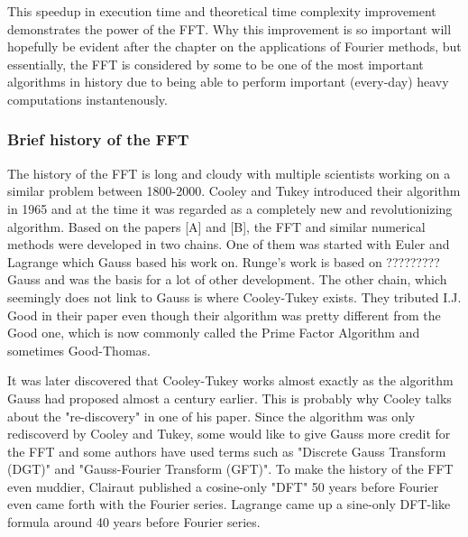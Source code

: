 This speedup in execution time and theoretical time complexity improvement demonstrates the power of the FFT. Why this improvement is so important will hopefully be evident after the chapter on the applications of Fourier methods, but essentially, the FFT is considered by some  to be one of the most important algorithms in history due to being able to perform important (every-day) heavy computations instantenously. 

\subsubsection{Brief history of the FFT} 
The history of the FFT is long and cloudy with multiple scientists working on a similar problem between 1800-2000. Cooley and Tukey introduced their algorithm in 1965 and at the time it was regarded as a completely new and revolutionizing algorithm. Based on the papers [A] and [B], the FFT and similar numerical methods were developed in two chains. One of them was started with Euler and Lagrange which Gauss based his work on. Runge's work is based on ????????? Gauss and was the basis for a lot of other development. The other chain, which seemingly does not link to Gauss is where Cooley-Tukey exists. They tributed I.J. Good in their paper even though their algorithm was pretty different from the Good one, which is now commonly called the Prime Factor Algorithm and sometimes Good-Thomas. 


It was later discovered that Cooley-Tukey works almost exactly as the algorithm Gauss had proposed almost a century earlier. This is probably why Cooley talks about the "re-discovery" in one of his paper. Since the algorithm was only rediscoverd by Cooley and Tukey, some would like to give Gauss more credit for the FFT and some authors have used terms such as "Discrete Gauss Transform (DGT)" and "Gauss-Fourier Transform (GFT)". To make the history of the FFT even muddier, Clairaut published a cosine-only "DFT" 50 years before Fourier even came forth with the Fourier series. Lagrange came up a sine-only DFT-like formula around 40 years before Fourier series.


